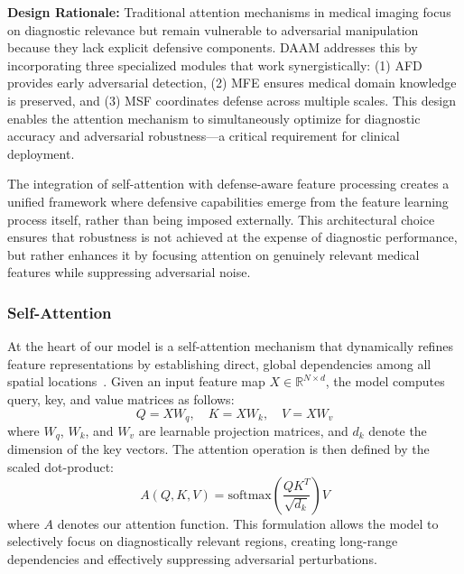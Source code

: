 \documentclass[preprint,12pt]{elsarticle}
\begin{document}
\textbf{Design Rationale:} Traditional attention mechanisms in medical imaging focus on diagnostic relevance but remain vulnerable to adversarial manipulation because they lack explicit defensive components. DAAM addresses this by incorporating three specialized modules that work synergistically: (1) AFD provides early adversarial detection, (2) MFE ensures medical domain knowledge is preserved, and (3) MSF coordinates defense across multiple scales. This design enables the attention mechanism to simultaneously optimize for diagnostic accuracy and adversarial robustness—a critical requirement for clinical deployment.

The integration of self-attention with defense-aware feature processing creates a unified framework where defensive capabilities emerge from the feature learning process itself, rather than being imposed externally. This architectural choice ensures that robustness is not achieved at the expense of diagnostic performance, but rather enhances it by focusing attention on genuinely relevant medical features while suppressing adversarial noise.

\subsubsection{Self-Attention}
At the heart of our model is a self-attention mechanism that dynamically refines feature representations by establishing direct, global dependencies among all spatial locations~\cite{Xu21}. Given an input feature map $X \in \mathbb{R}^{N \times d}$, the model computes query, key, and value matrices as follows:
\begin{equation}
Q = XW_q, \quad K = XW_k, \quad V = XW_v
\end{equation}
where $W_q$, $W_k$, and $W_v$ are learnable projection matrices, and $d_k$ denote the dimension of the key vectors. The attention operation is then defined by the scaled dot-product:
\begin{equation}
A(Q, K, V) = \text{softmax}\left(\frac{QK^T}{\sqrt{d_k}}\right)V
\end{equation}
where $A$ denotes our attention function. This formulation allows the model to selectively focus on diagnostically relevant regions, creating long-range dependencies and effectively suppressing adversarial perturbations.
\end{document}
